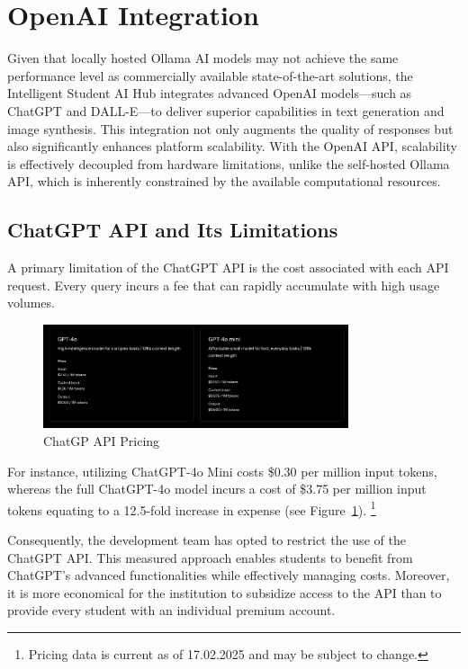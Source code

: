 
\section{OpenAI Integration}

Given that locally hosted Ollama AI models may not achieve the same performance level as commercially available state-of-the-art solutions, 
the Intelligent Student AI Hub integrates advanced OpenAI models—such as ChatGPT and DALL-E—to deliver superior capabilities in text generation and image synthesis. 
This integration not only augments the quality of responses but also significantly enhances platform scalability. With the OpenAI API, 
scalability is effectively decoupled from hardware limitations, unlike the self-hosted Ollama API, which is inherently constrained by the available computational 
resources.

\subsection{ChatGPT API and Its Limitations}

A primary limitation of the ChatGPT API is the cost associated with each API request. 
Every query incurs a fee that can rapidly accumulate with high usage volumes. 

\begin{figure}[H]
    \centering
    \includegraphics[width=0.8\textwidth]{figures/ChatGPT-API_Pricing.png}
    \caption{ChatGP API Pricing}
    \label{fig:chatgpt_api_integration}
\end{figure}

\cite{ChatGPT-API-Pricing}

For instance, utilizing ChatGPT-4o Mini costs \$0.30 per million input tokens, 
whereas the full ChatGPT-4o model incurs a cost of \$3.75 per million input tokens equating to a 12.5-fold increase in expense 
(see Figure~\ref{fig:chatgpt_api_integration}).
\footnote{Pricing data is current as of 17.02.2025 and may be subject to change.} 

Consequently, the development team has opted to restrict the use of the ChatGPT API. 
This measured approach enables students to benefit from ChatGPT’s advanced functionalities while effectively managing costs. 
Moreover, it is more economical for the institution to subsidize access to the API than to provide every student with an individual premium account.

